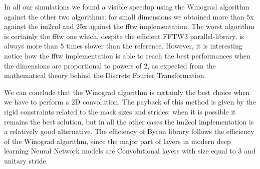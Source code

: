 \documentclass{standalone}
\begin{document}
In all our simulations we found a visible speedup using the \textsf{Winograd} algorithm against the other two algorithms: for small dimensions we obtained more than $5$x against the \textsf{im2col} and $25$x against the \textsf{fftw} implementation.
The worst algorithm is certainly the \textsf{fftw} one which, despite the efficient \textsf{FFTW3} parallel-library, is always more than $5$ times slower than the reference.
However, it is interesting notice how the \textsf{fftw} implementation is able to reach the best performances when the dimensions are proportional to powers of $2$, as expected from the mathematical theory behind the Discrete Fourier Transformation.

We can conclude that the \textsf{Winograd} algorithm is certainly the best choice when we have to perform a 2D convolution.
The payback of this method is given by the rigid constraints related to the mask sizes and strides: when it is possible it remains the best solution, but in all the other cases the \textsf{im2col} implementation is a relatively good alternative.
The efficiency of \textsf{Byron} library follows the efficiency of the \textsf{Winograd} algorithm, since the major part of layers in modern deep learning Neural Network models are Convolutional layers with size equal to $3$ and unitary stride.

\end{document}
